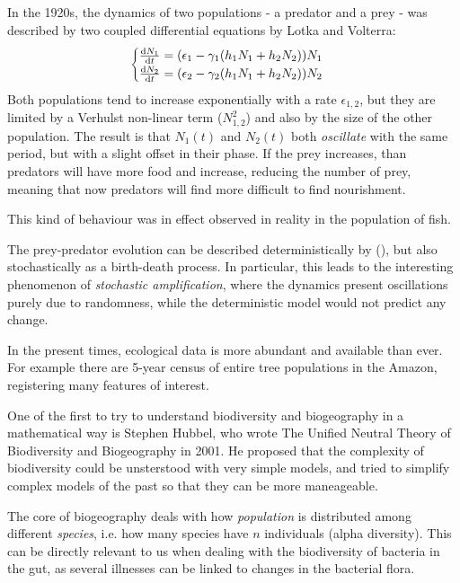\documentclass[../../main.tex]{subfiles}
\begin{document}
In the 1920s, the dynamics of two populations - a predator and a prey - was described by two coupled differential equations by Lotka and Volterra:
\begin{align*}
    \begin{cases}
        \dv{N_1}{t} = (\epsilon_1 - \gamma_1(h_1 N_1 + h_2 N_2))N_1\\
        \dv{N_2}{t} = (\epsilon_2 - \gamma_2(h_1 N_1 + h_2 N_2))N_2
    \end{cases}
\end{align*}
Both populations tend to increase exponentially with a rate $\epsilon_{1,2}$, but they are limited by a Verhulst non-linear term ($N_{1,2}^2$) and also by the size of the other population. %
The result is that $N_1(t)$ and $N_2(t)$ both \textit{oscillate} with the same period, but with a slight offset in their phase. If the prey increases, than predators will have more food and increase, reducing the number of prey, meaning that now predators will find more difficult to find nourishment. 

This kind of behaviour was in effect observed in reality in the population of fish.

The prey-predator evolution can be described deterministically by (), but also stochastically as a birth-death process. In particular, this leads to the interesting phenomenon of \textit{stochastic amplification}, where the dynamics present oscillations purely due to randomness, while the deterministic model would not predict any change.

In the present times, ecological data is more abundant and available than ever. For example there are 5-year census of entire tree populations in the Amazon, registering many features of interest.

One of the first to try to understand biodiversity and biogeography in a mathematical way is Stephen Hubbel, who wrote The Unified Neutral Theory of Biodiversity and Biogeography in 2001. He proposed that the complexity of biodiversity could be unsterstood with very simple models, and tried to simplify complex models of the past so that they can be more maneageable.

The core of biogeography deals with how \textit{population} is distributed among different \textit{species}, i.e. how many species have $n$ individuals (alpha diversity). This can be directly relevant to us when dealing with the biodiversity of bacteria in the gut, as several illnesses can be linked to changes in the bacterial flora.
\end{document}
